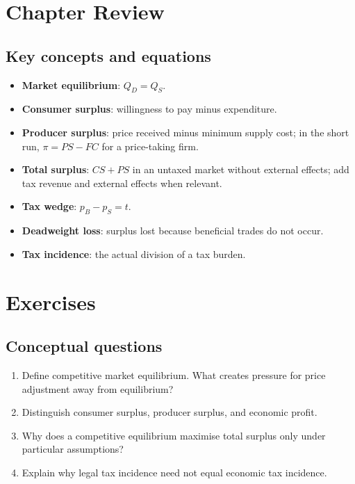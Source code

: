 \section*{Chapter Review}

\subsection*{Key concepts and equations}
\begin{itemize}
  \item \textbf{Market equilibrium}: $Q_D=Q_S$.
  \item \textbf{Consumer surplus}: willingness to pay minus expenditure.
  \item \textbf{Producer surplus}: price received minus minimum supply cost;
  in the short run, $\pi=PS-FC$ for a price-taking firm.
  \item \textbf{Total surplus}: $CS+PS$ in an untaxed market without
  external effects; add tax revenue and external effects when relevant.
  \item \textbf{Tax wedge}: $p_B-p_S=t$.
  \item \textbf{Deadweight loss}: surplus lost because beneficial trades do not occur.
  \item \textbf{Tax incidence}: the actual division of a tax burden.
\end{itemize}

\section*{Exercises}

\subsection*{Conceptual questions}
\begin{enumerate}[label=\arabic*.]
  \item Define competitive market equilibrium. What creates pressure for price adjustment away from equilibrium?
  \item Distinguish consumer surplus, producer surplus, and economic profit.
  \item Why does a competitive equilibrium maximise total surplus only under particular assumptions?
  \item Explain why legal tax incidence need not equal economic tax incidence.
\end{enumerate}

